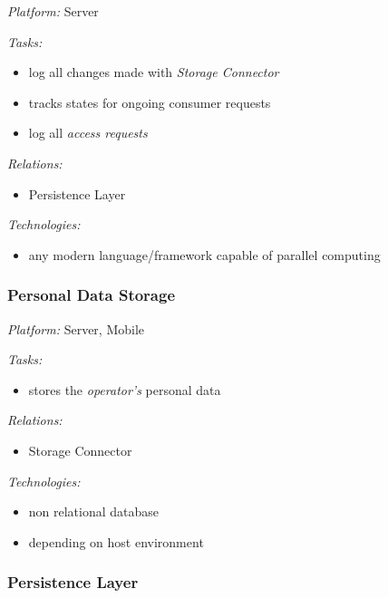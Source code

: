 \documentclass[12pt,english,a4paper,titlepage,cleardoublepage=empty,dottedtoc]{report}
\providecommand{\tightlist}{%
  \setlength{\itemsep}{0pt}\setlength{\parskip}{0pt}}
\begin{document}
\emph{Platform:} Server

\emph{Tasks:}

\begin{itemize}
\tightlist
\item
  log all changes made with \emph{Storage Connector}
\item
  tracks states for ongoing consumer requests
\item
  log all \emph{access requests}
\end{itemize}

\emph{Relations:}

\begin{itemize}
\tightlist
\item
  Persistence Layer
\end{itemize}

\emph{Technologies:}

\begin{itemize}
\tightlist
\item
  any modern language/framework capable of parallel computing
\end{itemize}

\subsubsection*{Personal Data Storage}\label{personal-data-storage}

\emph{Platform:} Server, Mobile

\emph{Tasks:}

\begin{itemize}
\tightlist
\item
  stores the \emph{operator's} personal data
\end{itemize}

\emph{Relations:}

\begin{itemize}
\tightlist
\item
  Storage Connector
\end{itemize}

\emph{Technologies:}

\begin{itemize}
\tightlist
\item
  non relational database
\item
  depending on host environment
\end{itemize}

\subsubsection*{Persistence Layer}\label{persistence-layer}
\end{document}
